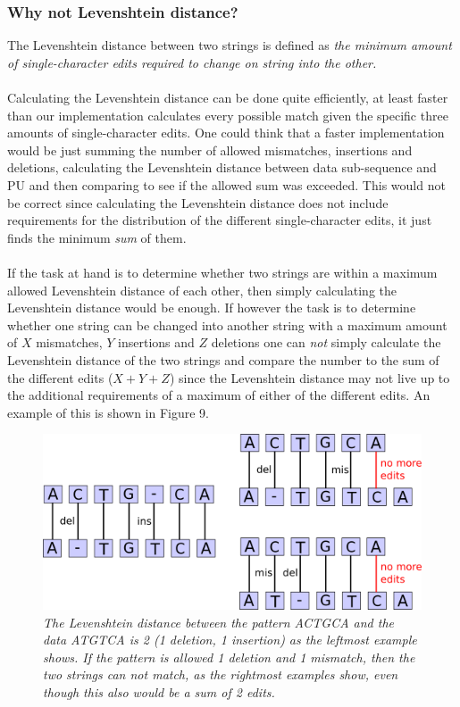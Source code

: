 \documentclass[12pt]{article}
\newcommand{\pu}{PU }
\begin{document}
\subsubsection{Why not Levenshtein distance?}
The Levenshtein distance between two strings is defined as \textit{the minimum amount of single-character edits required
to change on string into the other.}~\cite{leve} \\ \\
Calculating the Levenshtein distance can be done quite efficiently, at least faster than our implementation calculates
every possible match given the specific three amounts of single-character edits. One could think that a faster 
implementation would be just summing
the number of allowed mismatches, insertions and deletions, calculating the Levenshtein distance between data sub-sequence
and \pu and then comparing to see if the allowed sum was exceeded. This would not be correct since
calculating the Levenshtein distance does not include requirements for the distribution of the different 
single-character edits, it just finds the minimum \textit{sum} of them. \\ \\
If the task at hand is to determine whether two strings are within a maximum allowed Levenshtein distance of each other,
then simply calculating the Levenshtein distance would be enough. 
If however the task is to determine whether one string can be changed into another string with a maximum amount of $X$  mismatches, $Y$ insertions and $Z$ deletions one can \textit{not} simply calculate the Levenshtein distance of the two
strings and compare the number to the sum of the different edits ($X+Y+Z$) since the Levenshtein distance may not live
up to the additional requirements of a maximum of either of the different edits. An example of this is shown in Figure 9. \\
\begin{figure}[H]
\begin{center}
\includegraphics[scale=0.8]{Diagrams/leven.png}
\end{center}
\caption{\textit{The Levenshtein distance between the pattern ACTGCA and the data ATGTCA is 2 
(1 deletion, 1 insertion) as the leftmost example shows. If the pattern is allowed 1 deletion and 1 mismatch, then
the two strings can not match, as the rightmost examples show, even though this also would be a sum of 2 edits.}}
\end{figure}
\end{document}
